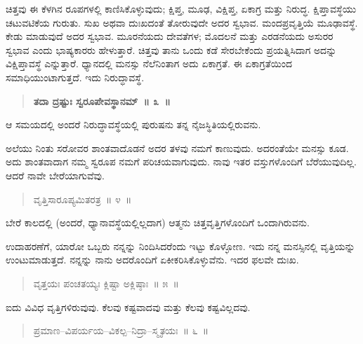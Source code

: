 ಚಿತ್ತವು ಈ ಕೆಳಗಿನ ರೂಪಗಳಲ್ಲಿ ಕಾಣಿಸಿಕೊಳ್ಳುವುದು; ಕ್ಷಿಪ್ತ, ಮೂಢ, ವಿಕ್ಷಿಪ್ತ, ಏಕಾಗ್ರ ಮತ್ತು ನಿರುದ್ಧ. ಕ್ಷಿಪ್ತಾವಸ್ಥೆಯು ಚಟುವಟಿಕೆಯ ಗುರುತು. ಸುಖ ಅಥವಾ ದುಃಖದಂತೆ ತೋರುವುದೇ ಅದರ ಸ್ವಭಾವ. ಮಂದಪ್ರವೃತ್ತಿಯೆ ಮೂಢಾವಸ್ಥೆ. ಕೇಡು ಮಾಡುವುದೆ ಅದರ ಸ್ವಭಾವ. ಮೂರನೆಯದು ದೇವತೆಗಳ; ಮೊದಲನೆ ಮತ್ತು ಎರಡನೆಯದು ಅಸುರರ ಸ್ವಭಾವ ಎಂದು ಭಾಷ್ಯಕಾರರು ಹೇಳುತ್ತಾರೆ. ಚಿತ್ತವು ತಾನು ಒಂದು ಕಡೆ ಸೇರಬೇಕೆಂದು ಪ್ರಯತ್ನಿಸಿದಾಗ ಅದನ್ನು ವಿಕ್ಷಿಪ್ತಾವಸ್ಥೆ ಎನ್ನುತ್ತಾರೆ. ಧ್ಯಾನದಲ್ಲಿ ಮನಸ್ಸು ನೆಲೆನಿಂತಾಗ ಅದು ಏಕಾಗ್ರತೆ. ಈ ಏಕಾಗ್ರತೆಯಿಂದ ಸಮಾಧಿಯುಂಟಾಗುತ್ತದೆ. ಇದು ನಿರುದ್ಧಾವಸ್ಥೆ. 

\vspace{-0.2cm}

\begin{verse}
\textbf{ತದಾ ದ್ರಷ್ಟುಃ ಸ್ವರೂಪೇವಸ್ಥಾನಮ್​~॥ ೩~॥}
\end{verse}

\vspace{-0.1cm}

ಆ ಸಮಯದಲ್ಲಿ ಅಂದರೆ ನಿರುದ್ಧಾವಸ್ಥೆಯಲ್ಲಿ ಪುರುಷನು ತನ್ನ ನೈಜಸ್ಥಿತಿಯಲ್ಲಿರುವನು. 

ಅಲೆಯು ನಿಂತು ಸರೋವರ ಶಾಂತವಾದೊಡನೆ ಅದರ ತಳವು ನಮಗೆ ಕಾಣುವುದು. ಅದರಂತೆಯೇ ಮನಸ್ಸು ಕೂಡ. ಅದು ಶಾಂತವಾದಾಗ ನಮ್ಮ ಸ್ವರೂಪ ನಮಗೆ ಪರಿಚಯವಾಗುವುದು. ನಾವು ಇತರ ವಸ್ತುಗಳೊಂದಿಗೆ ಬೆರೆಯುವುದಿಲ್ಲ. ಆದರೆ ನಾವೇ ಬೇರೆಯಾಗುವೆವು. 

\vspace{-0.2cm}

\begin{verse}
ವೃತ್ತಿಸಾರೂಪ್ಯಮಿತರತ್ರ~॥ ೪~॥
\end{verse}

\vspace{-0.1cm}

ಬೇರೆ ಕಾಲದಲ್ಲಿ (ಅಂದರೆ, ಧ್ಯಾನಾವಸ್ಥೆಯಲ್ಲಿಲ್ಲದಾಗ) ಆತ್ಮನು ಚಿತ್ತವೃತ್ತಿಗಳೊಂದಿಗೆ ಒಂದಾಗಿರುವನು. 

ಉದಾಹರಣೆಗೆ, ಯಾರೋ ಒಬ್ಬರು ನನ್ನನ್ನು ನಿಂದಿಸಿದರೆಂದು ಇಟ್ಟು ಕೊಳ್ಳೋಣ. ಇದು ನನ್ನ ಮನಸ್ಸಿನಲ್ಲಿ ವೃತ್ತಿಯನ್ನು ಉಂಟುಮಾಡುತ್ತದೆ. ನನ್ನನ್ನು ನಾನು ಅದರೊಂದಿಗೆ ಏಕೀಕರಿಸಿಕೊಳ್ಳುವೆನು. ಇದರ ಫಲವೇ ದುಃಖ. 

\vspace{-0.2cm}

\begin{verse}
ವೃತ್ತಯಃ ಪಂಚತಯ್ಯಃ ಕ್ಲಿಷ್ಟಾ ಅಕ್ಲಿಷ್ಠಾಃ~॥ ೫~॥
\end{verse}

\vspace{-0.1cm}

ಐದು ವಿವಿಧ ವೃತ್ತಿಗಳಿರುವುವು. ಕೆಲವು ಕಷ್ಟವಾದವು ಮತ್ತು ಕೆಲವು ಕಷ್ಟವಿಲ್ಲದವು. 

\vspace{-0.2cm}

\begin{verse}
ಪ್ರಮಾಣ–ವಿಪರ್ಯಯ–ವಿಕಲ್ಪ–ನಿದ್ರಾ–ಸ್ಮೃತಯಃ~॥ ೬~॥
\end{verse}

